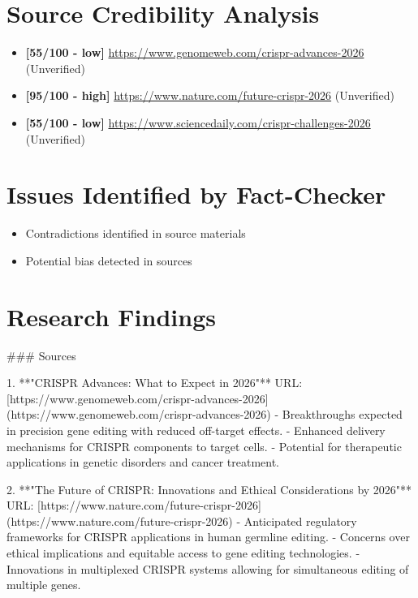 \documentclass[11pt,a4paper]{article}
\begin{document}
\section{Source Credibility Analysis}

\begin{itemize}[leftmargin=*]
\item \textbf{[55/100 - low]} \href{https://www.genomeweb.com/crispr-advances-2026}{https://www.genomeweb.com/crispr-advances-2026} (Unverified)
\item \textbf{[95/100 - high]} \href{https://www.nature.com/future-crispr-2026}{https://www.nature.com/future-crispr-2026} (Unverified)
\item \textbf{[55/100 - low]} \href{https://www.sciencedaily.com/crispr-challenges-2026}{https://www.sciencedaily.com/crispr-challenges-2026} (Unverified)
\end{itemize}

\section{Issues Identified by Fact-Checker}

\begin{itemize}[leftmargin=*]
\item Contradictions identified in source materials
\item Potential bias detected in sources
\end{itemize}

\newpage

\section{Research Findings}

\#\#\# Sources

1. **"CRISPR Advances: What to Expect in 2026"**  
   URL: [https://www.genomeweb.com/crispr-advances-2026](https://www.genomeweb.com/crispr-advances-2026)  
   - Breakthroughs expected in precision gene editing with reduced off-target effects.
   - Enhanced delivery mechanisms for CRISPR components to target cells.
   - Potential for therapeutic applications in genetic disorders and cancer treatment.

2. **"The Future of CRISPR: Innovations and Ethical Considerations by 2026"**  
   URL: [https://www.nature.com/future-crispr-2026](https://www.nature.com/future-crispr-2026)  
   - Anticipated regulatory frameworks for CRISPR applications in human germline editing.
   - Concerns over ethical implications and equitable access to gene editing technologies.
   - Innovations in multiplexed CRISPR systems allowing for simultaneous editing of multiple genes.
\end{document}
